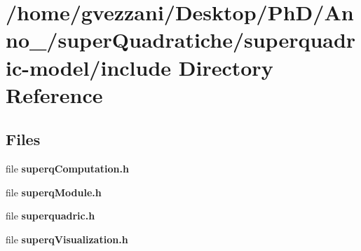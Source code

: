 \section{/home/gvezzani/\-Desktop/\-Ph\-D/\-Anno\-\_/super\-Quadratiche/superquadric-\/model/include Directory Reference}
\label{dir_d44c64559bbebec7f509842c48db8b23}
\subsection*{Files}
\begin{DoxyCompactItemize}
\item 
file {\bfseries superq\-Computation.\-h}
\item 
file {\bfseries superq\-Module.\-h}
\item 
file {\bfseries superquadric.\-h}
\item 
file {\bfseries superq\-Visualization.\-h}
\end{DoxyCompactItemize}
